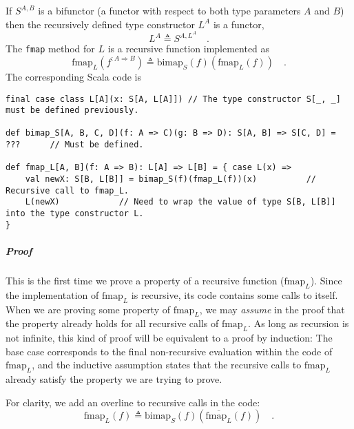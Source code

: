 If $S^{A,B}$ is a bifunctor (a functor with respect to both type
parameters $A$ and $B$) then the recursively defined type constructor
$L^{A}$ is a functor,
\[
L^{A}\triangleq S^{A,L^{A}}\quad.
\]
The \lstinline!fmap! method for $L$ is a recursive function implemented
as
\begin{equation}
\text{fmap}_{L}(f^{:A\Rightarrow B})\triangleq\text{bimap}_{S}(f)(\text{fmap}_{L}(f))\quad.\label{eq:def-recursive-functor-fmap}
\end{equation}
The corresponding Scala code is
\begin{lstlisting}
final case class L[A](x: S[A, L[A]]) // The type constructor S[_, _] must be defined previously.

def bimap_S[A, B, C, D](f: A => C)(g: B => D): S[A, B] => S[C, D] = ???      // Must be defined.

def fmap_L[A, B](f: A => B): L[A] => L[B] = { case L(x) =>
    val newX: S[B, L[B]] = bimap_S(f)(fmap_L(f))(x)          // Recursive call to fmap_L.
    L(newX)            // Need to wrap the value of type S[B, L[B]] into the type constructor L.
}
\end{lstlisting}


\subparagraph{Proof}

This is the first time we prove a property of a recursive function
($\text{fmap}_{L}$). Since the implementation of $\text{fmap}_{L}$
is recursive, its code contains some calls to itself. When we are
proving some property of $\text{fmap}_{L}$, we may \emph{assume}
in the proof that the property already holds for all recursive calls
of $\text{fmap}_{L}$. As long as recursion is not infinite, this
kind of proof will be equivalent to a proof by induction: The base
case corresponds to the final non-recursive evaluation within the
code of $\text{fmap}_{L}$, and the inductive assumption states that
the recursive calls to $\text{fmap}_{L}$ already satisfy the property
we are trying to prove.

For clarity, we add an overline to recursive calls in the code:
\[
\text{fmap}_{L}(f)\triangleq\text{bimap}_{S}(f)(\overline{\text{fmap}_{L}}(f))\quad.
\]


